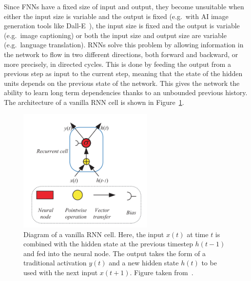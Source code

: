 Since FNNs have a fixed size of input and output, they become unsuitable when
either the input size is variable and the output is fixed (e.g.\ with AI image
generation tools like Dall-E~\cite{ramesh2021zero}), the input size is fixed and
the output is variable (e.g.\ image captioning) or both the input size and
output size are variable (e.g.\ language translation). RNNs solve this problem
by allowing information in the network to flow in two different directions, both
forward and backward, or more precisely, in directed cycles. This is done by
feeding the output from a previous step as input to the current step, meaning
that the state of the hidden units depends on the previous state of the network.
This gives the network the ability to learn long term dependencies thanks to an
unbounded previous history. The architecture of a vanilla RNN cell is shown in
Figure~\ref{fig:rnn_cell_example}.

\begin{figure}[ht]
  \centering
  \includegraphics[width=0.6\textwidth]{figures/rnn_cell_example.png}
  \caption{Diagram of a vanilla RNN cell. Here, the input $x(t)$ at time $t$ is
    combined with the hidden state at the previous timestep $h(t-1)$
    and fed into the neural node. The output takes the form of a traditional
    activation $y(t)$ and a new hidden state $h(t)$ to be used with the
    next input $x(t+1)$. Figure taken
  from~\cite{yu2019review}.}\label{fig:rnn_cell_example}
\end{figure}

